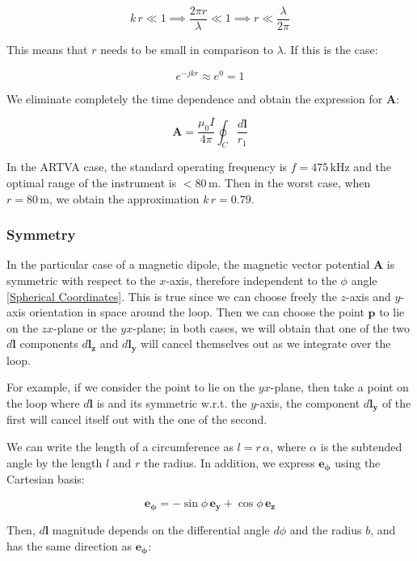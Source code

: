 \[
    k \, r \ll 1 \implies \frac{2\pi r}{\lambda} 
    \ll 1 \implies r \ll \frac{\lambda}{2\pi}
\]

This means that $r$ needs to be small in comparison 
to $\lambda$. If this is the case:

\[
    e^{-j k r} \approx e^0 = 1
\]

We eliminate completely the time dependence and 
obtain the expression for $\mathbf{A}$:

\begin{equation}
    \mathbf{A} = \frac{\mu_0 I}{4\pi} \oint_C 
    \frac{d\mathbf{l}}{r_1}
    \label{A_approx}
\end{equation}

In the ARTVA case, the standard operating frequency 
is \( f = 475 \, \text{kHz} \) and the optimal range 
of the instrument is \( <80 \, \text{m} \). Then in 
the worst case, when \( r = 80 \, \text{m} \), we 
obtain the approximation \( k \, r = 0.79 \).

\subsubsection{Symmetry}

In the particular case of a magnetic dipole, the 
magnetic vector potential $\mathbf{A}$ is symmetric 
with respect to the \(x\)-axis, therefore independent 
to the $\phi$ angle \ref{Spherical Coordinates}. 
This is true since we can choose freely the $z$-axis 
and $y$-axis orientation in space around the loop. 
Then we can choose the point $\mathbf{p}$ to lie on 
the $zx$-plane or the $yx$-plane; in both cases, we 
will obtain that one of the two $d\mathbf{l}$ 
components $d\mathbf{l_z}$ and $d\mathbf{l_y}$ will 
cancel themselves out as we integrate over the loop.

For example, if we consider the point to lie on the 
$yx$-plane, then take a point on the loop where 
$d\mathbf{l}$ is and its symmetric w.r.t. the 
$y$-axis, the component $d\mathbf{l_y}$ of the first 
will cancel itself out with the one of the second.

We can write the length of a circumference as 
$l = r \, \alpha$, where $\alpha$ is the subtended 
angle by the length $l$ and $r$ the radius. In 
addition, we express $\mathbf{e_\phi}$ using the 
Cartesian basis:

$$
    \mathbf{e_\phi} = - \sin\phi \, \mathbf{e_y} 
    + \cos\phi \, \mathbf{e_z}
$$

Then, $d\mathbf{l}$ magnitude depends on the 
differential angle $d\phi$ and the radius $b$, and 
has the same direction as $\mathbf{e_\phi}$:

